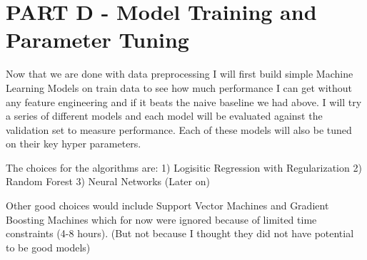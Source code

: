 \documentclass[11pt]{article}
\begin{document}
    \section{PART D - Model Training and Parameter
Tuning}\label{part-d---model-training-and-parameter-tuning}

Now that we are done with data preprocessing I will first build simple
Machine Learning Models on train data to see how much performance I can
get without any feature engineering and if it beats the naive baseline
we had above. I will try a series of different models and each model
will be evaluated against the validation set to measure performance.
Each of these models will also be tuned on their key hyper parameters.

The choices for the algorithms are: 1) Logisitic Regression with
Regularization 2) Random Forest 3) Neural Networks (Later on)

Other good choices would include Support Vector Machines and Gradient
Boosting Machines which for now were ignored because of limited time
constraints (4-8 hours). (But not because I thought they did not have
potential to be good models)
\end{document}
